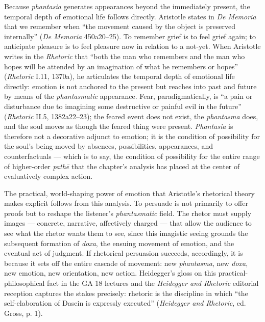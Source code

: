 Because \textit{phantasia} generates appearances beyond the immediately present, the temporal depth of emotional life follows directly. Aristotle states in \textit{De Memoria} that we remember when ``the movement caused by the object is preserved internally'' (\textit{De Memoria} 450a20--25). To remember grief is to feel grief again; to anticipate pleasure is to feel pleasure now in relation to a not-yet. When Aristotle writes in the \textit{Rhetoric} that ``both the man who remembers and the man who hopes will be attended by an imagination of what he remembers or hopes'' (\textit{Rhetoric} I.11, 1370a), he articulates the temporal depth of emotional life directly: emotion is not anchored to the present but reaches into past and future by means of the \textit{phantasmatic} appearance. Fear, paradigmatically, is ``a pain or disturbance due to imagining some destructive or painful evil in the future'' (\textit{Rhetoric} II.5, 1382a22--23); the feared event does not exist, the \textit{phantasma} does, and the soul moves as though the feared thing were present. \textit{Phantasia} is therefore not a decorative adjunct to emotion; it is the condition of possibility for the soul's being-moved by absences, possibilities, appearances, and counterfactuals --- which is to say, the condition of possibility for the entire range of higher-order \textit{pathē} that the chapter's analysis has placed at the center of evaluatively complex action.

The practical, world-shaping power of emotion that Aristotle's rhetorical theory makes explicit follows from this analysis. To persuade is not primarily to offer proofs but to reshape the listener's \textit{phantasmatic} field. The rhetor must supply images --- concrete, narrative, affectively charged --- that allow the audience to see what the rhetor wants them to see, since this imagistic seeing grounds the subsequent formation of \textit{doxa}, the ensuing movement of emotion, and the eventual act of judgment. If rhetorical persuasion succeeds, accordingly, it is because it sets off the entire cascade of movement: new \textit{phantasma}, new \textit{doxa}, new emotion, new orientation, new action. Heidegger's gloss on this practical-philosophical fact in the GA 18 lectures and the \textit{Heidegger and Rhetoric} editorial reception captures the stakes precisely: rhetoric is the discipline in which ``the self-elaboration of Dasein is expressly executed'' (\textit{Heidegger and Rhetoric}, ed. Gross, p. 1).

